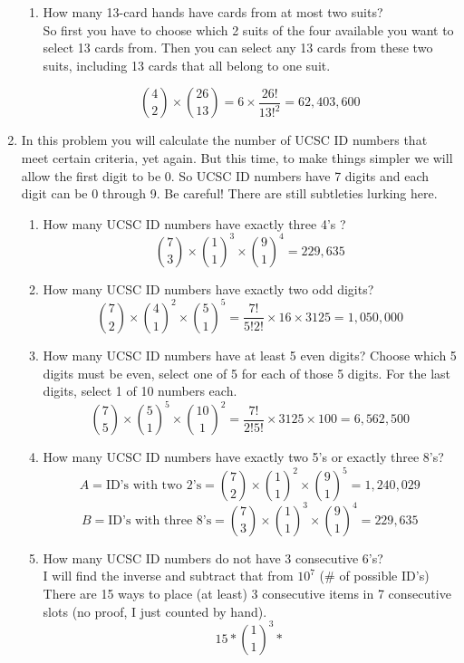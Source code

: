 \documentclass[a4paper,11pt]{article}
\begin{document}
\begin{enumerate}
\begin{enumerate}
  \item How many 13-card hands have cards from at most two suits? \\
  So first you have to choose which 2 suits of the four available you want to select 13 cards from. Then you can select any 13 cards from these two suits, including 13 cards that all belong to one suit.

  \[ {4 \choose 2} \times {26 \choose 13} = 6 \times \frac{26!}{13!^2} = 62,403,600\]

  \end{enumerate}



\item In this problem you will calculate the number of UCSC ID numbers that meet certain
criteria, yet again. But this time, to make things simpler we will allow the first digit to be 0. So UCSC
ID numbers have 7 digits and each digit can be 0 through 9. Be careful! There are still subtleties
lurking here. 
  \begin{enumerate}
  \item How many UCSC ID numbers have exactly three 4’s ? \\
  \[ {7 \choose 3} \times {1 \choose 1}^{3} \times {9 \choose 1}^4 = 229,635\]

  \item How many UCSC ID numbers have exactly two odd digits?
  \[ {7 \choose 2} \times {4 \choose 1}^2 \times {5 \choose 1}^5 = \frac{7!}{5!2!} \times 16 \times 3125 = 1,050,000 \]

  \item How many UCSC ID numbers have at least 5 even digits?
  Choose which 5 digits must be even, select one of 5 for each of those 5 digits. For the last digits, select 1 of 10 numbers each.
  \[ {7 \choose 5} \times {5 \choose 1}^5 \times {10 \choose 1}^2 = \frac{7!}{2!5!} \times 3125 \times 100 = 6,562,500\]

  \item How many UCSC ID numbers have exactly two 5’s or exactly three 8’s?
  \[ A = \text{ID's with two 2's} = {7 \choose 2}\times{1 \choose 1}^2 \times {9 \choose 1}^5 =1,240,029 \]
  \[ B = \text{ID's with three 8's} = {7\choose3}\times{1\choose1}^3\times{9\choose1}^4 = 229,635\]

  \item How many UCSC ID numbers do not have 3 consecutive 6’s? \\
  I will find the inverse and subtract that from $10^7$ (\# of possible ID's) \\
  There are 15 ways to place (at least) 3 consecutive items in 7 consecutive slots (no proof, I just counted by hand).
  \[ 15*{1\choose1}^3* \]


\end{enumerate}
\end{enumerate}
\end{document}
